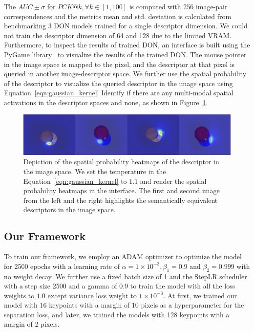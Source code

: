 The $AUC \pm \sigma$ for $PCK@k, \forall k \in [1, 100]$ is computed with 256 image-pair correspondences and
the metrics mean and std. deviation is calculated from benchmarking 3 DON models trained for a single descriptor dimension.
We could not train the descriptor dimension of 64 and 128 due to the limited VRAM. Furthermore, to inspect the
results of trained DON, an interface is built using the PyGame library~\cite{pygame} to visualize the results of the trained DON.
The mouse pointer in the image space is mapped to the pixel, and the descriptor at that pixel is queried in another image-descriptor space.
We further use the spatial probability of the descriptor to visualize the queried descriptor
in the image space using Equation~\ref{eqn:gaussian_kernel}
Identify if there are any multi-modal spatial activations in the descriptor spaces and none, as shown in Figure~\ref{fig:check_don}.

\begin{figure}[htb]
    \centering
    \includegraphics[scale=0.25]{images/test_don.png}
    \caption{Depiction of the spatial probability heatmaps of the descriptor in the image space. We set the temperature in the Equation~\ref{eqn:gaussian_kernel} to $1.1$
        and render the spatial probability heatmaps in the interface. The first and second image from the left and the right highlights the semantically equivalent descriptors in the image space.}
    \label{fig:check_don}
\end{figure}


\subsection{Our Framework}

To train our framework, we employ an ADAM optimizer to optimize the model for 2500 epochs with a learning rate of
$\alpha = 1 \times 10^{-3}, \beta_1 = 0.9 \text{ and } \beta_2 = 0.999$ with no weight decay.
We further use a fixed batch size of 1 and the StepLR scheduler with a step size 2500 and a gamma of 0.9 to train the model with all the loss weights to $1.0$ except variance loss weight to $1 \times 10^{-3}$.
At first, we trained our model with 16 keypoints with a margin of 10 pixels as a hyperparameter for the separation loss, and later, we trained the models with 128 keypoints with a margin of 2 pixels.

